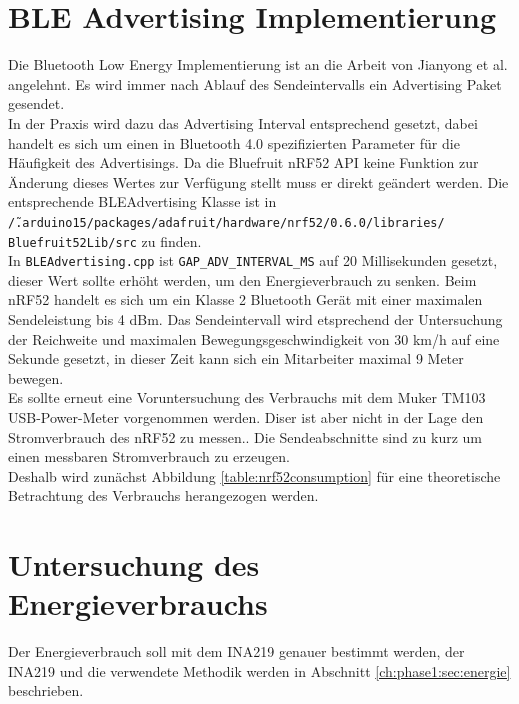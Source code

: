 \section{BLE Advertising Implementierung}
\label{ch:phase3:sec:advertising}
Die Bluetooth Low Energy Implementierung ist an die Arbeit von Jianyong et al. angelehnt.
Es wird immer nach Ablauf des Sendeintervalls ein Advertising Paket gesendet.\\
In der Praxis wird dazu das Advertising Interval entsprechend gesetzt, dabei handelt es sich um einen in Bluetooth 4.0 spezifizierten Parameter für die Häufigkeit des Advertisings.
Da die Bluefruit nRF52 API keine Funktion zur Änderung dieses Wertes zur Verfügung stellt muss er direkt geändert werden.
Die entsprechende BLEAdvertising Klasse ist in \\\texttt{\~/.arduino15/packages/adafruit/hardware/nrf52/0.6.0/libraries/}\\\texttt{Bluefruit52Lib/src} zu finden. \\
In \texttt{BLEAdvertising.cpp} ist \texttt{GAP\_ADV\_INTERVAL\_MS} auf 20 Millisekunden gesetzt, dieser Wert sollte erhöht werden, um den Energieverbrauch zu senken.
Beim nRF52 handelt es sich um ein Klasse 2 Bluetooth Gerät mit einer maximalen Sendeleistung bis 4 dBm.
Das Sendeintervall wird etsprechend der Untersuchung der Reichweite und maximalen Bewegungsgeschwindigkeit von 30 km/h auf eine Sekunde gesetzt, in dieser Zeit kann sich ein Mitarbeiter maximal 9 Meter bewegen.\\
Es sollte erneut eine Voruntersuchung des Verbrauchs mit dem Muker TM103 USB-Power-Meter vorgenommen werden.
Diser ist aber nicht in der Lage den Stromverbrauch des nRF52 zu messen..
Die Sendeabschnitte sind zu kurz um einen messbaren Stromverbrauch zu erzeugen.\\
Deshalb wird zunächst Abbildung \ref{table:nrf52consumption} für eine theoretische Betrachtung des Verbrauchs herangezogen werden. 




\section{Untersuchung des Energieverbrauchs}
Der Energieverbrauch soll mit dem INA219 genauer bestimmt werden, der INA219 und die verwendete Methodik werden in Abschnitt \ref{ch:phase1:sec:energie} beschrieben.

